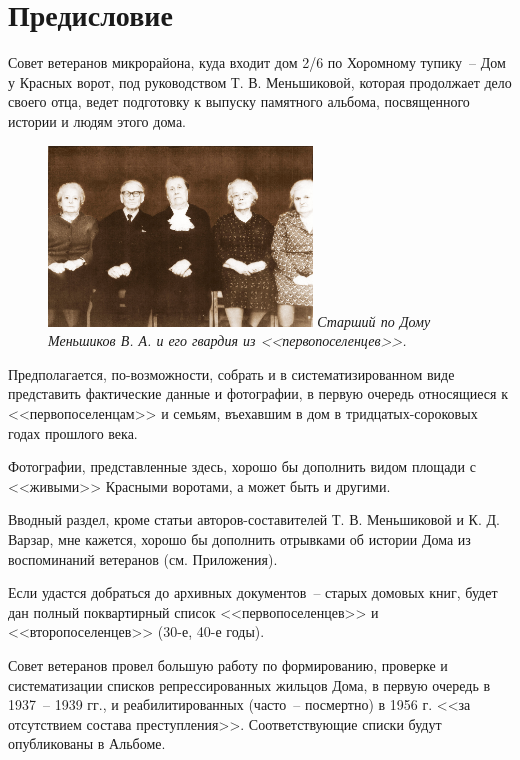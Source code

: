 \chapter{Предисловие}

\noindent
Совет ветеранов микрорайона, куда входит дом 2/6 по Хоромному тупику~-- Дом у Красных ворот, под руководством Т. В. Меньшиковой, которая продолжает дело своего отца, ведет подготовку к выпуску памятного альбома, посвященного истории и людям этого дома.

\vspace{10pt}

\begin{figure}[ht]
  \centering
  \begin{minipage}{7cm}
  \includegraphics[width=7cm]{inc/3/1}
  \textit{\footnotesize{ Старший по Дому Меньшиков В. А. и его гвардия из <<первопоселенцев>>.}}
  \end{minipage}
\end{figure}

Предполагается, по-возможности, собрать и в систематизированном виде представить фактические данные и фотографии, в первую очередь относящиеся к <<первопоселенцам>> и семьям, въехавшим в дом в тридцатых-сороковых годах прошлого века.

Фотографии, представленные здесь, хорошо бы дополнить видом площади с <<живыми>> Красными воротами, а может быть и другими.

Вводный раздел, кроме статьи авторов-составителей Т. В. Меньшиковой и К. Д. Варзар, мне кажется, хорошо бы дополнить отрывками об истории Дома из воспоминаний ветеранов (см. Приложения).

Если удастся добраться до архивных документов~-- старых домовых книг, будет дан полный поквартирный список <<первопоселенцев>> и <<второпоселенцев>> (30-е, 40-е годы).

Совет ветеранов провел большую работу по формированию, проверке и систематизации списков репрессированных жильцов Дома, в первую очередь в 1937~-- 1939 гг., и реабилитированных (часто~-- посмертно) в 1956 г. <<за отсутствием состава преступления>>. Соответствующие списки будут опубликованы в Альбоме.

